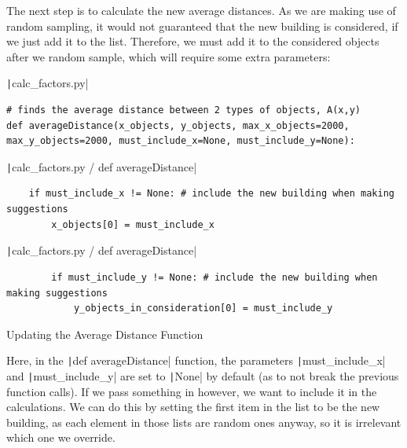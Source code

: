 \documentclass[12pt]{report}
\newcommand{\pil}[1]{\protect\texttt|#1|}
\begin{document}
\begin{center}
\end{center}

The next step is to calculate the new average distances. As we are making use of random sampling, it would not guaranteed that the new building is considered, if we just add it to the list. Therefore, we must add it to the considered objects after we random sample, which will require some extra parameters:

\begin{listing}[H]
\pil{calc_factors.py}
\begin{verbatim}
# finds the average distance between 2 types of objects, A(x,y)
def averageDistance(x_objects, y_objects, max_x_objects=2000, max_y_objects=2000, must_include_x=None, must_include_y=None):
\end{verbatim}
\pil{calc_factors.py / def averageDistance}
\begin{verbatim}
    if must_include_x != None: # include the new building when making suggestions
        x_objects[0] = must_include_x
\end{verbatim}
\pil{calc_factors.py / def averageDistance}
\begin{verbatim}
        if must_include_y != None: # include the new building when making suggestions
            y_objects_in_consideration[0] = must_include_y
\end{verbatim}
\caption{Updating the Average Distance Function}\label{cs:updateAverageDistance}
\end{listing}

Here, in the \pil{def averageDistance} function, the parameters \pil{must_include_x} and \pil{must_include_y} are set to \pil{None} by default (as to not break the previous function calls). If we pass something in however, we want to include it in the calculations. We can do this by setting the first item in the list to be the new building, as each element in those lists are random ones anyway, so it is irrelevant which one we override.
\end{document}
